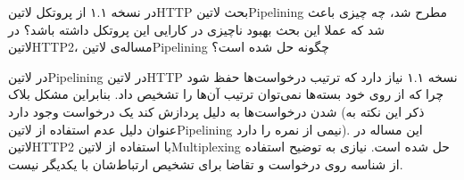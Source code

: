
در نسخه ۱.۱ از پروتکل ‌لاتین{HTTP} بحث ‌لاتین{Pipelining} مطرح شد، چه چیزی باعث شد که عملا این بحث بهبود ناچیزی در کارایی این پروتکل داشته باشد؟
در ‌لاتین{HTTP2}، مساله‌ی ‌لاتین{Pipelining} چگونه حل شده است؟


\begin{پاسخ}

در ‌لاتین{Pipelining} در ‌لاتین{HTTP} نسخه ۱.۱ نیاز دارد که ترتیب درخواست‌ها حفظ شود
چرا که از روی خود بسته‌ها نمی‌توان ترتیب آن‌ها را تشخیص داد.
بنابراین مشکل بلاک شدن درخواست‌ها به دلیل پردازش کند یک درخواست
وجود دارد (ذکر این نکته به عنوان دلیل عدم استفاده از ‌لاتین{Pipelining} نیمی از نمره را دارد). این مساله در ‌لاتین{HTTP2} با استفاده از ‌لاتین{Multiplexing} حل شده است.
نیازی به توضیح استفاده از شناسه روی درخواست و تقاضا برای تشخیص ارتباط‌شان با یکدیگر نیست.

\end{پاسخ}
